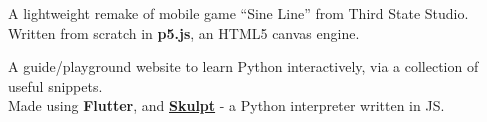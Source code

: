 \documentclass[]{resume}
\begin{document}
\begin{minipage}[t]{0.62\textwidth}
A lightweight remake of mobile game “Sine Line” from Third State Studio.\\
Written from scratch in \textbf{p5.js}, an HTML5 canvas engine.
\sectionsep

A guide/playground website to learn Python interactively, via a collection of useful snippets.\\
Made using \textbf{Flutter}, and \href{https://skulpt.org}{\textbf{Skulpt}} - a Python interpreter written in JS.
\sectionsep





% 
% 


\end{minipage} 
\end{document}
